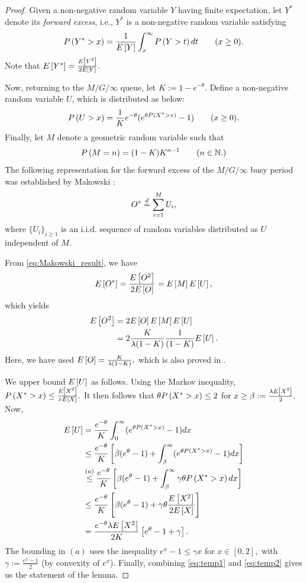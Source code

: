 \begin{proof}
  Given a non-negative random variable $Y$ having finite expectation,
  let $Y^*$ denote its \emph{forward excess}, i.e., $Y^*$ is a
  non-negative random variable satisfying
  $$P\left(Y^* > x\right) = \frac{1}{E\left[Y\right]} \int_x^{\infty} P\left(Y > t\right) dt
  \qquad (x \geq 0).$$ Note that
  $E\left[Y^*\right] = \frac{E\left[Y^2\right]}{2 E\left[Y\right]}.$

  Now, returning to the $M/G/\infty$ queue, let $K:= 1-e^{-\theta}.$
Define a  non-negative random variable $U$, which is distributed as below:
$$P\left(U > x\right) = \frac{1}{K} e^{-\theta}(e^{\theta P\left(X^* > x\right)} - 1)
\qquad (x \geq 0).$$ Finally, let $M$ denote a geometric random
variable such that $$P\left(M = n\right) = (1-K) K^{n-1} \qquad (n \in \mathbb{N}.)$$
The following representation for the forward excess of the
$M/G/\infty$ busy period was established by Makowski \cite{Makowski11}:
\begin{equation}
  \label{eq:Makowski_result}
  O^* \stackrel{d}{=} \sum_{i = 1}^M U_i,
\end{equation}
where $\{U_i\}_{i \geq 1}$ is an i.i.d. sequence of random variables
distributed as $U$ independent of $M.$

From \eqref{eq:Makowski_result}, we have
$$E\left[O^*\right] = \frac{E\left[O^2\right]}{2 E\left[O\right]} = E\left[M\right] E\left[U\right],$$ which
yields
\begin{align}
  E\left[O^2\right] &= 2 E\left[O\right] E\left[M\right] E\left[U\right] \nonumber \\
             &= 2 \frac{K}{\lambda(1-K)} \frac{1}{(1-K)} E\left[U\right].
               \label{eq:temp1}
\end{align}
Here, we have used $E\left[O\right] = \frac{K}{\lambda(1-K)},$ which is also
proved in \cite{Makowski11}.

We upper bound $E\left[U\right]$ as follows. Using the Markov inequality,
$P\left(X^* > x\right) \leq \frac{E\left[X^2\right]}{x E\left[X\right]}.$ It then follows
that $\theta P\left(X^* > x\right) \leq 2$ for
$x \geq \beta := \frac{\lambda E\left[X^2\right]}{2}.$
Now,
\begin{align}
  E\left[U\right] &= \frac{e^{-\theta}}{K} \int_{0}^{\infty} (e^{\theta P\left(X^* > x\right)} - 1) dx \nonumber \\ 
          &\leq \frac{e^{-\theta}}{K} \left[\beta (e^{\theta} - 1) + \int_{\beta}^{\infty} (e^{\theta P\left(X^* > x\right)} - 1) dx\right] \nonumber \\
          &\stackrel{(a)}\leq \frac{e^{-\theta}}{K} \left[\beta (e^{\theta} - 1) + \int_{\beta}^{\infty} \gamma \theta P\left(X^* > x\right) dx\right] \nonumber \\
          &\leq \frac{e^{-\theta}}{K} \left[\beta (e^{\theta} - 1) + \gamma \theta \frac{E\left[X^2\right]}{2E\left[X\right]} \right]\nonumber \\
          &= \frac{e^{-\theta} \lambda E\left[X^2\right]}{2K} \left[e^{\theta} - 1 + \gamma \right].
            \label{eq:temp2}
\end{align}
The bounding in $(a)$ uses the inequality $e^{x} - 1 \leq \gamma x$
for $x \in [0,2],$ with $\gamma := \frac{e^2-1}{2}$ (by convexity of $e^x$). Finally,
combining \eqref{eq:temp1} and \eqref{eq:temp2} gives us the statement
of the lemma.
\end{proof}

